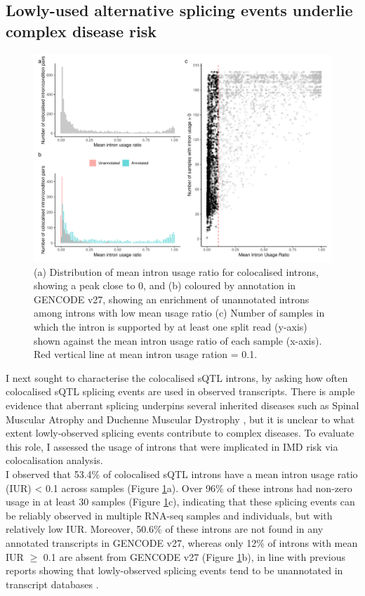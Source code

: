 \subsection{Lowly-used alternative splicing events underlie complex disease risk}
\begin{figure}[H]
  \centering
  \includegraphics[width=\textwidth]{low_sj}
  \caption[Intron usage of colocalised introns]{(a) Distribution of mean intron usage ratio for colocalised introns, showing a peak close to 0, and (b) coloured by annotation in GENCODE v27, showing an enrichment of unannotated introns among introns with low mean usage ratio (c) Number of samples in which the intron is supported by at least one split read (y-axis) shown against the mean intron usage ratio of each sample (x-axis). Red vertical line at mean intron usage ration  = 0.1.}
  \label{fig:low_sj}   
\end{figure}
I next sought to characterise the colocalised sQTL introns, by asking how often colocalised sQTL splicing events are used in observed transcripts. There is ample evidence that aberrant splicing underpins several inherited diseases such as Spinal Muscular Atrophy and Duchenne Muscular Dystrophy \cite{Symoens2011-ew,Abramowicz2018-by,Sanz2017-re}, but it is unclear to what extent lowly-observed splicing events contribute to complex diseases. To evaluate this role, I assessed the usage of introns that were implicated in IMD risk via colocalisation analysis. \\

I observed that 53.4\% of colocalised sQTL introns have a mean intron usage ratio (IUR) < 0.1 across samples (Figure \ref{fig:low_sj}a). Over 96\% of these introns had non-zero usage in at least 30 samples (Figure \ref{fig:low_sj}c), indicating that these splicing events can be reliably observed in multiple RNA-seq samples and individuals, but with relatively low IUR. Moreover, 50.6\% of these introns are not found in any annotated transcripts in GENCODE v27, whereas only 12\% of introns with mean IUR $\geq$ 0.1 are absent from GENCODE v27 (Figure \ref{fig:low_sj}b), in line with previous reports showing that lowly-observed splicing events tend to be unannotated in transcript databases \cite{Nellore2016-fj,Pickrell2010-lz}. \\

